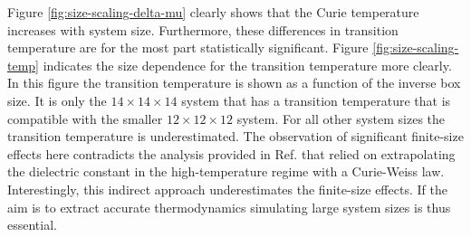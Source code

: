 Figure \ref{fig:size-scaling-delta-mu} clearly shows that the Curie temperature increases with system size.  Furthermore, these differences in transition temperature are for the most part statistically significant.  Figure \ref{fig:size-scaling-temp} indicates the size dependence for the transition temperature more clearly.  In this figure the transition temperature is shown as a function of the inverse box size.  It is only the $14\times14\times14$ system that has a transition temperature that is compatible with the smaller  $12\times12\times12$ system.  For all other system sizes the transition temperature is  underestimated. The observation of significant finite-size effects here contradicts the analysis provided in Ref. \cite{gigli_thermodynamics_2022} that relied on extrapolating the dielectric constant in the high-temperature regime with a Curie-Weiss law. Interestingly, this indirect approach underestimates the finite-size effects. If the aim is to extract accurate thermodynamics simulating large system sizes is thus essential.




